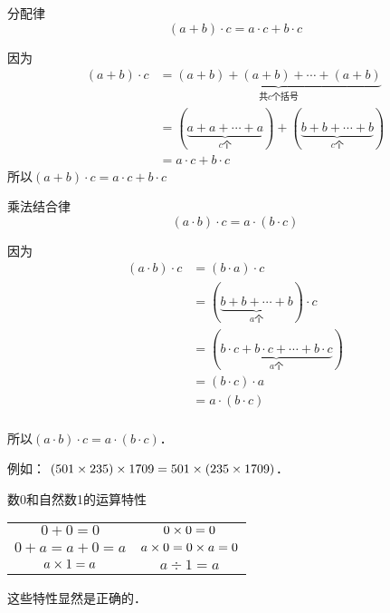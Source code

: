 \begin{blk}{分配律}
	\[(a+b)\cdot c=a\cdot c+b\cdot c \]
\end{blk}
\begin{note}
	因为
	\begin{align*}
	(a+b)\cdot c&=\underbrace{(a+b)+(a+b)+\cdots+(a+b)}_{\text{共$c$个括号}} \tag{乘法的意义}\\
	&=(\underbrace{a+a+\cdots+a}_{c\text{个}})+(\underbrace{b+b+\cdots +b}_{c\text{个}})\tag{加法结合律与交换律}\\
	&=a\cdot c+b\cdot c   \tag{乘法的意义} 
	\end{align*}
	所以$(a+b)\cdot c=a\cdot c+b\cdot c $
\end{note}


\begin{blk}{乘法结合律}
	\[(a\cdot b)\cdot c=a\cdot (b\cdot c) \]
\end{blk}

\begin{note}
	因为
	\begin{align*}
	(a\cdot b)\cdot c&=(b\cdot a)\cdot c \tag{乘法交换律}\\
	&=(\underbrace{b+b+\cdots +b}_{a\text{个}})\cdot c \tag{乘法的意义}\\
	&=(\underbrace{b\cdot c+b\cdot c+\cdots +b\cdot c}_{a\text{个}})  \tag{分配律} \\
	&=(b\cdot c)\cdot a \tag{乘法的意义}\\
	&=a\cdot (b\cdot c) \tag{乘法交换律}\\
	\end{align*}
	
	所以$(a\cdot b)\cdot c=a\cdot (b\cdot c)$．
	
	例如：  $(501\times   235) \times 1709=501\times    (235 \times 1709)$．    
\end{note}

\begin{blk}{数0和自然数1的运算特性}
	\begin{center}
		\begin{tabular}{cc}
			$0+0=0$   &   $0\times 0=0$\\
			$0+a=a+0=a$   &   $a\times 0=0\times a=0$\\
			$a\times 1=a$   &   $a\div 1=a$\\       
		\end{tabular}     
	\end{center}
\end{blk}

这些特性显然是正确的．

